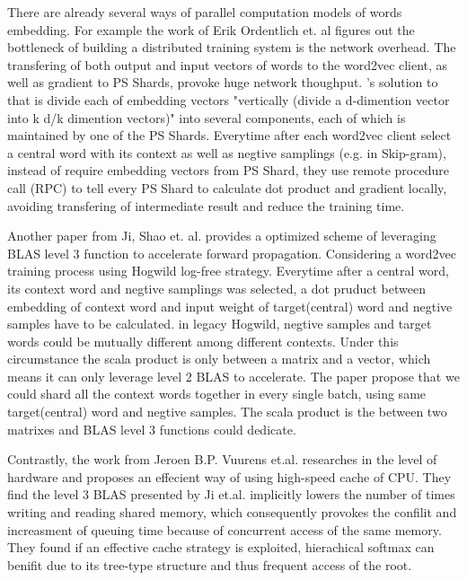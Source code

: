 \documentclass[11pt,a4paper]{article}
\begin{document}
There are already several ways of parallel computation models of words embedding. For example the work of Erik Ordentlich et. al \cite{ordentlich2016network} figures out the bottleneck of building a distributed training system is the network overhead. The transfering of both output and input vectors of words to the word2vec client, as well as gradient to PS Shards, provoke huge network thoughput. \citep{ordentlich2016network}'s solution to that is divide each of embedding vectors "vertically (divide a d-dimention vector into k d/k dimention vectors)" into several components, each of which is maintained by one of the PS Shards. Everytime after each word2vec client select a central word with its context as well as negtive samplings (e.g. in Skip-gram), instead of require embedding vectors from PS Shard, they use remote procedure call (RPC) to tell every PS Shard to calculate dot product and gradient locally, avoiding transfering of intermediate result and reduce the training time.

Another paper from Ji, Shao et. al. \cite{ji2016parallelizing} provides a optimized scheme of leveraging BLAS level 3 function to accelerate forward propagation. Considering a word2vec training process using Hogwild \cite{recht2011hogwild} log-free strategy. Everytime after a central word, its context word and negtive samplings was selected, a dot pruduct between embedding of context word and input weight of target(central) word and negtive samples have to be calculated. in legacy Hogwild, negtive samples and target words could be mutually different among different contexts. Under this circumstance the scala product is only between a matrix and a vector, which means it can only leverage level 2 BLAS to accelerate. The paper propose that we could shard all the context words together in every single batch, using same target(central) word and negtive samples. The scala product is the between two matrixes and BLAS level 3 functions could dedicate.

Contrastly, the work from Jeroen B.P. Vuurens et.al. \cite{eickhoff2016efficient} researches in the level of hardware and proposes an effecient way of using high-speed cache of CPU. They find the level 3 BLAS presented by Ji et.al. implicitly lowers the number of times writing and reading shared memory, which consequently provokes the confilit and increasment of queuing time because of concurrent access of the same memory. They found if an effective cache strategy is exploited, hierachical softmax can benifit due to its tree-type structure and  thus frequent access of the root.
\end{document}
